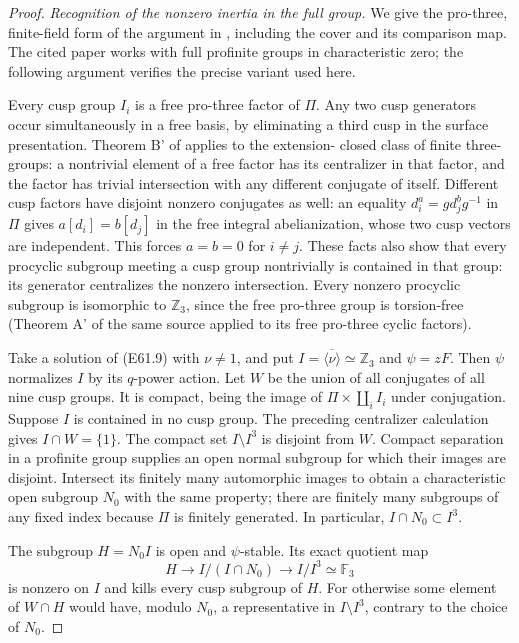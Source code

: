 \begin{proof}
\emph{Recognition of the nonzero inertia in the full group.}
We give the pro-three, finite-field form of the argument in
\cite[Theorem 30]{E_StixCuspidal}, including the cover and its
comparison map. The cited paper works with full profinite
groups in characteristic zero; the following argument verifies
the precise variant used here.

Every cusp group $I_i$ is a free pro-three factor of $\Pi$.
Any two cusp generators occur simultaneously in a free basis,
by eliminating a third cusp in the surface presentation.
Theorem B' of \cite{A_HerfortRibes1985} applies to the extension-
closed class of finite three-groups: a nontrivial element of
a free factor has its centralizer in that factor, and the
factor has trivial intersection with any different conjugate
of itself. Different cusp factors have disjoint nonzero
conjugates as well: an equality
$d_i^a=g d_j^b g^{-1}$ in $\Pi$ gives
$a[d_i]=b[d_j]$ in the free integral abelianization, whose two
cusp vectors are independent. This forces $a=b=0$ for $i\ne j$.
These facts also show that every procyclic subgroup meeting
a cusp group nontrivially is contained in that group: its
generator centralizes the nonzero intersection. Every nonzero
procyclic subgroup is isomorphic to $\mathbb Z_3$, since the
free pro-three group is torsion-free (Theorem A' of the same
source applied to its free pro-three cyclic factors).

Take a solution of (E61.9) with $\nu\ne1$, and put
$I=\overline{\langle\nu\rangle}\simeq\mathbb Z_3$ and
$\psi=zF$. Then $\psi$ normalizes $I$ by its $q$-power action.
Let $W$ be the union of all conjugates of all nine cusp groups.
It is compact, being the image of
$\Pi\times\coprod_i I_i$ under conjugation.
Suppose $I$ is contained in no cusp group. The preceding
centralizer calculation gives $I\cap W=\{1\}$.
The compact set $I\setminus I^3$ is disjoint from $W$.
Compact separation in a profinite group supplies an open
normal subgroup for which their images are disjoint.
Intersect its finitely many automorphic images to obtain a
characteristic open subgroup $N_0$ with the same property;
there are finitely many subgroups of any fixed index because
$\Pi$ is finitely generated. In particular,
$I\cap N_0\subset I^3$.

The subgroup $H=N_0I$ is open and $\psi$-stable. Its exact
quotient map
\[
 H\longrightarrow I/(I\cap N_0)
           \longrightarrow I/I^3\simeq\mathbb F_3
 \tag{E61.10}
\]
is nonzero on $I$ and kills every cusp subgroup of $H$.
For otherwise some element of $W\cap H$ would have, modulo
$N_0$, a representative in $I\setminus I^3$, contrary to the
choice of $N_0$.


\end{proof}
